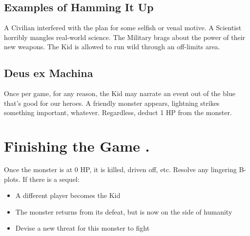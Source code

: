 \documentclass[10pt,oneside,letterpaper,landscape]{memoir}
\newcommand\rep{\leavevmode\xleaders\hbox{.}\hfill\kern0pt}
\begin{document}
\begin{multicols}{3}
\subsection{Examples of Hamming It Up}

A Civilian interfered with the plan for some selfish or venal motive.
A Scientist horribly mangles real-world science.
The Military brags about the power of their new weapons.
The Kid is allowed to run wild through an off-limits area.

\subsection{Deus ex Machina}

Once per game, for any reason, the Kid may narrate an event out of the blue that's good for our heroes. A friendly monster appears, lightning strikes something important, whatever. Regardless, deduct 1 HP from the monster.

\vspace*{\fill}

\columnbreak

\section{Finishing the Game \rep}

Once the monster is at 0 HP, it is killed, driven off, etc. Resolve any lingering B-plots. If there is a sequel:

\begin{itemize}
\item A different player becomes the Kid
\item The monster returns from its defeat, but is now on the side of humanity
\item Devise a new threat for this monster to fight
\end{itemize}

\end{multicols}

\end{document}
